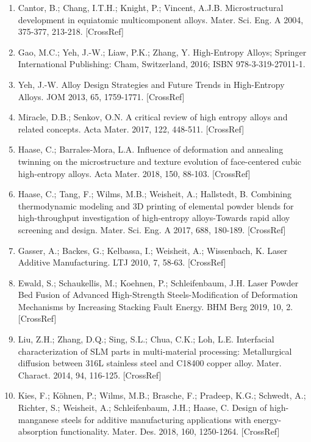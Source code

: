 \documentclass[10pt]{article}
\begin{document}
\begin{enumerate}
  \item Cantor, B.; Chang, I.T.H.; Knight, P.; Vincent, A.J.B. Microstructural development in equiatomic multicomponent alloys. Mater. Sci. Eng. A 2004, 375-377, 213-218. [CrossRef]

  \item Gao, M.C.; Yeh, J.-W.; Liaw, P.K.; Zhang, Y. High-Entropy Alloys; Springer International Publishing: Cham, Switzerland, 2016; ISBN 978-3-319-27011-1.

  \item Yeh, J.-W. Alloy Design Strategies and Future Trends in High-Entropy Alloys. JOM 2013, 65, 1759-1771. [CrossRef]

  \item Miracle, D.B.; Senkov, O.N. A critical review of high entropy alloys and related concepts. Acta Mater. 2017, 122, 448-511. [CrossRef]

  \item Haase, C.; Barrales-Mora, L.A. Influence of deformation and annealing twinning on the microstructure and texture evolution of face-centered cubic high-entropy alloys. Acta Mater. 2018, 150, 88-103. [CrossRef]

  \item Haase, C.; Tang, F.; Wilms, M.B.; Weisheit, A.; Hallstedt, B. Combining thermodynamic modeling and 3D printing of elemental powder blends for high-throughput investigation of high-entropy alloys-Towards rapid alloy screening and design. Mater. Sci. Eng. A 2017, 688, 180-189. [CrossRef]

  \item Gasser, A.; Backes, G.; Kelbassa, I.; Weisheit, A.; Wissenbach, K. Laser Additive Manufacturing. LTJ 2010, 7, 58-63. [CrossRef]

  \item Ewald, S.; Schaukellis, M.; Koehnen, P.; Schleifenbaum, J.H. Laser Powder Bed Fusion of Advanced High-Strength Steels-Modification of Deformation Mechanisms by Increasing Stacking Fault Energy. BHM Berg 2019, 10, 2. [CrossRef]

  \item Liu, Z.H.; Zhang, D.Q.; Sing, S.L.; Chua, C.K.; Loh, L.E. Interfacial characterization of SLM parts in multi-material processing: Metallurgical diffusion between 316L stainless steel and C18400 copper alloy. Mater. Charact. 2014, 94, 116-125. [CrossRef]

  \item Kies, F.; Köhnen, P.; Wilms, M.B.; Brasche, F.; Pradeep, K.G.; Schwedt, A.; Richter, S.; Weisheit, A.; Schleifenbaum, J.H.; Haase, C. Design of high-manganese steels for additive manufacturing applications with energy-absorption functionality. Mater. Des. 2018, 160, 1250-1264. [CrossRef]


\end{enumerate}
\end{document}
